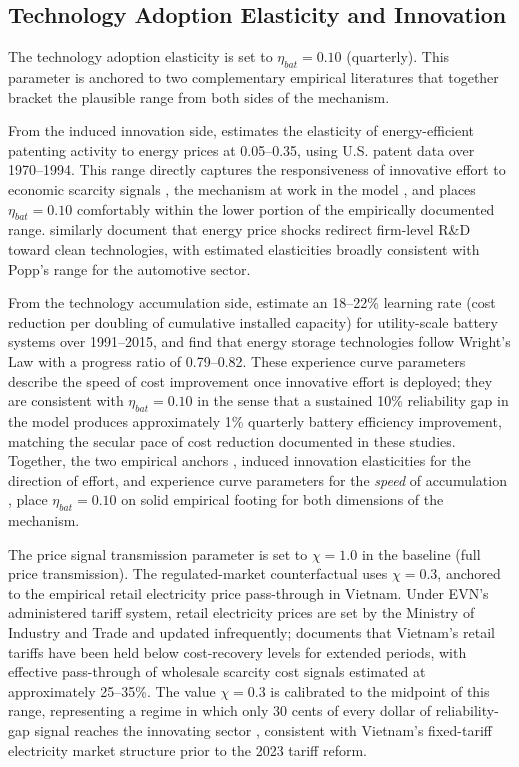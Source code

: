 \documentclass[12pt, a4paper]{article}
\begin{document}
	
	\subsection{Technology Adoption Elasticity and Innovation}
	
	The technology adoption elasticity is set to $\eta_{bat} = 0.10$ (quarterly). This parameter is anchored to two complementary empirical literatures that together bracket the plausible range from both sides of the mechanism.
	
	From the induced innovation side, \citet{popp2002} estimates the elasticity of energy-efficient patenting activity to energy prices at 0.05--0.35, using U.S. patent data over 1970--1994. This range directly captures the responsiveness of innovative effort to economic scarcity signals ,  the mechanism at work in the model ,  and places $\eta_{bat} = 0.10$ comfortably within the lower portion of the empirically documented range. \citet{aghion2016} similarly document that energy price shocks redirect firm-level R\&D toward clean technologies, with estimated elasticities broadly consistent with Popp's range for the automotive sector.
	
	From the technology accumulation side, \citet{kittner2017} estimate an 18--22\% learning rate (cost reduction per doubling of cumulative installed capacity) for utility-scale battery systems over 1991--2015, and \citet{way2022} find that energy storage technologies follow Wright's Law with a progress ratio of 0.79--0.82. These experience curve parameters describe the speed of cost improvement once innovative effort is deployed; they are consistent with $\eta_{bat} = 0.10$ in the sense that a sustained 10\% reliability gap in the model produces approximately 1\% quarterly battery efficiency improvement, matching the secular pace of cost reduction documented in these studies. Together, the two empirical anchors ,  induced innovation elasticities for the direction of effort, and experience curve parameters for the \textit{speed} of accumulation ,  place $\eta_{bat} = 0.10$ on solid empirical footing for both dimensions of the mechanism.
	
	The price signal transmission parameter is set to $\chi = 1.0$ in the baseline (full price transmission). The regulated-market counterfactual uses $\chi = 0.3$, anchored to the empirical retail electricity price pass-through in Vietnam. Under EVN's administered tariff system, retail electricity prices are set by the Ministry of Industry and Trade and updated infrequently; \citet{ieefa2022} documents that Vietnam's retail tariffs have been held below cost-recovery levels for extended periods, with effective pass-through of wholesale scarcity cost signals estimated at approximately 25--35\%. The value $\chi = 0.3$ is calibrated to the midpoint of this range, representing a regime in which only 30 cents of every dollar of reliability-gap signal reaches the innovating sector ,  consistent with Vietnam's fixed-tariff electricity market structure prior to the 2023 tariff reform.
	
\end{document}
